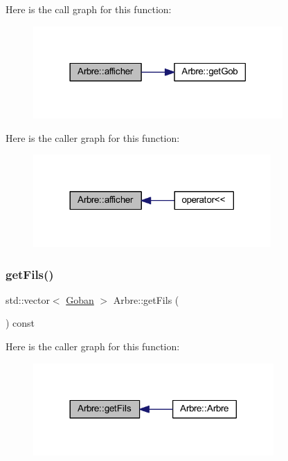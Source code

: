 Here is the call graph for this function\+:\nopagebreak
\begin{figure}[H]
\begin{center}
\leavevmode
\includegraphics[width=270pt]{class_arbre_a970de955ffdbbd5894e0fa0c40c4e69e_cgraph}
\end{center}
\end{figure}
Here is the caller graph for this function\+:\nopagebreak
\begin{figure}[H]
\begin{center}
\leavevmode
\includegraphics[width=257pt]{class_arbre_a970de955ffdbbd5894e0fa0c40c4e69e_icgraph}
\end{center}
\end{figure}
\mbox{\label{class_arbre_ace487e80301c07e6369108bf9a480513}} 
\subsubsection{\texorpdfstring{get\+Fils()}{getFils()}}
{\footnotesize\ttfamily std\+::vector$<$ \hyperlink{class_goban}{Goban} $>$ Arbre\+::get\+Fils (\begin{DoxyParamCaption}{ }\end{DoxyParamCaption}) const}

Here is the caller graph for this function\+:\nopagebreak
\begin{figure}[H]
\begin{center}
\leavevmode
\includegraphics[width=260pt]{class_arbre_ace487e80301c07e6369108bf9a480513_icgraph}
\end{center}
\end{figure}
\mbox{\label{class_arbre_a46ec1d0b89a9466c87a31e8e43133099}} 
